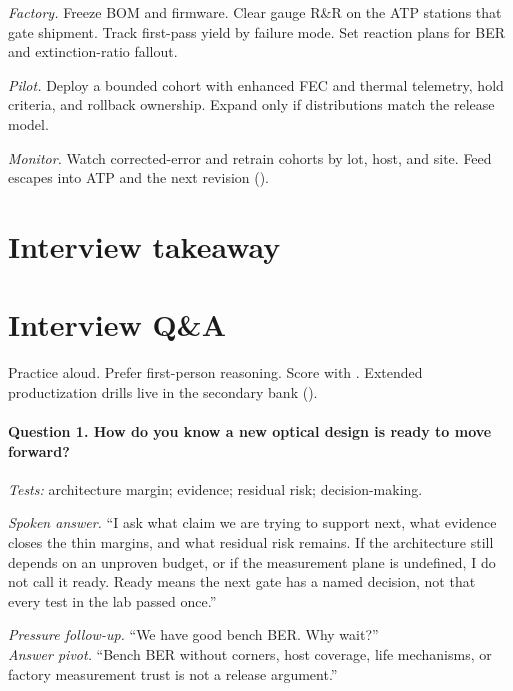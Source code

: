 \textit{Factory.} Freeze BOM and firmware. Clear gauge R\&R on the ATP
stations that gate shipment. Track first-pass yield by failure mode. Set
reaction plans for BER and extinction-ratio fallout.

\textit{Pilot.} Deploy a bounded cohort with enhanced FEC and thermal
telemetry, hold criteria, and rollback ownership. Expand only if distributions
match the release model.

\textit{Monitor.} Watch corrected-error and retrain cohorts by lot, host, and
site. Feed escapes into ATP and the next revision
().

\section{Interview takeaway}
\label{sec:productization-design-review}


\section{Interview Q\&A}
\label{sec:productization-interview-qa}

Practice aloud. Prefer first-person reasoning. Score with
. Extended productization drills live in the
secondary bank ().

\paragraph{Question 1. How do you know a new optical design is ready to move
forward?}
\textit{Tests:} architecture margin; evidence; residual risk; decision-making.

\textit{Spoken answer.}
``I ask what claim we are trying to support next, what evidence closes the
thin margins, and what residual risk remains. If the architecture still depends
on an unproven budget, or if the measurement plane is undefined, I do not call
it ready. Ready means the next gate has a named decision, not that every test
in the lab passed once.''

\textit{Pressure follow-up.} ``We have good bench BER. Why wait?''\\
\textit{Answer pivot.} ``Bench BER without corners, host coverage, life
mechanisms, or factory measurement trust is not a release argument.''

